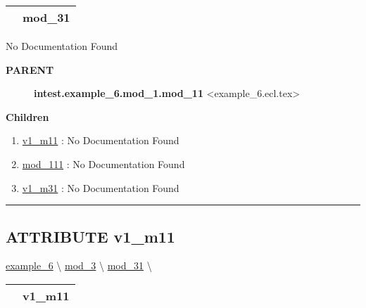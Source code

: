 {\renewcommand{\arraystretch}{1.5}
\begin{tabularx}{\textwidth}{|>{\raggedright\arraybackslash}l|X|}
\hline
\hspace{0pt}\mytexttt{\color{red} } & \textbf{mod\_31} \\
\hline
\end{tabularx}
}

\par





No Documentation Found










\par
\begin{description}
\item [\colorbox{tagtype}{\color{white} \textbf{\textsf{PARENT}}}] \textbf{intest.example\_6.mod\_1.mod\_11} <example\_6.ecl.tex>
\end{description}


\textbf{Children}
\begin{enumerate}
\item \hyperlink{ecldoc:intest.example_6.mod_1.mod_11.v1_m11}{v1\_m11}
: No Documentation Found
\item \hyperlink{ecldoc:intest.example_6.mod_1.mod_11.mod_111}{mod\_111}
: No Documentation Found
\item \hyperlink{ecldoc:intest.example_6.mod_3.mod_31.v1_m31}{v1\_m31}
: No Documentation Found
\end{enumerate}

\rule{\linewidth}{0.5pt}

\subsection*{\textsf{\colorbox{headtoc}{\color{white} ATTRIBUTE}
v1\_m11}}

\hypertarget{ecldoc:intest.example_6.mod_1.mod_11.v1_m11}{}
\hspace{0pt} \hyperlink{ecldoc:intest.example_6}{example_6} \textbackslash 
\hspace{0pt} \hyperlink{ecldoc:intest.example_6.mod_3}{mod_3} \textbackslash 
\hspace{0pt} \hyperlink{ecldoc:intest.example_6.mod_3.mod_31}{mod_31} \textbackslash 

{\renewcommand{\arraystretch}{1.5}
\begin{tabularx}{\textwidth}{|>{\raggedright\arraybackslash}l|X|}
\hline
\hspace{0pt}\mytexttt{\color{red} } & \textbf{v1\_m11} \\
\hline
\end{tabularx}
}

